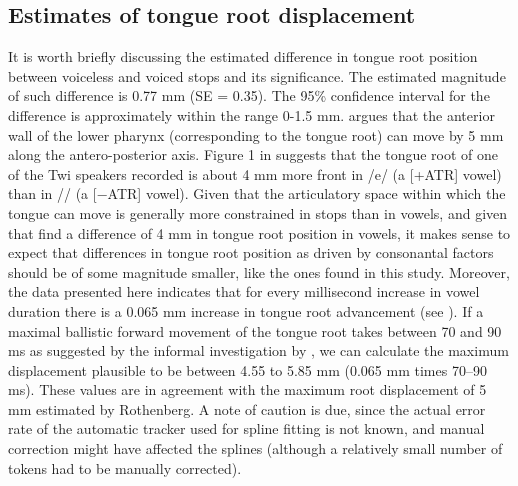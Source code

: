 \documentclass[preprint]{JASAnew}
\begin{document}
\hypertarget{estimates-of-tongue-root-displacement}{%
\subsection{Estimates of tongue root
displacement}\label{estimates-of-tongue-root-displacement}}

\label{s:estimates}

It is worth briefly discussing the estimated difference in tongue root
position between voiceless and voiced stops and its significance. The
estimated magnitude of such difference is 0.77 mm (SE = 0.35). The 95\%
confidence interval for the difference is approximately within the range
0-1.5 mm. \citet{rothenberg1967} argues that the anterior wall of the
lower pharynx (corresponding to the tongue root) can move by 5 mm along
the antero-posterior axis. Figure 1 in \citet{kirkham2017} suggests that
the tongue root of one of the Twi speakers recorded is about 4 mm more
front in /e/ (a {[}+ATR{]} vowel) than in /\textepsilon{}/ (a {[}−ATR{]}
vowel). Given that the articulatory space within which the tongue can
move is generally more constrained in stops than in vowels, and given
that \citet{kirkham2017} find a difference of 4 mm in tongue root
position in vowels, it makes sense to expect that differences in tongue
root position as driven by consonantal factors should be of some
magnitude smaller, like the ones found in this study. Moreover, the data
presented here indicates that for every millisecond increase in vowel
duration there is a 0.065 mm increase in tongue root advancement (see
). If a maximal ballistic forward movement of the
tongue root takes between 70 and 90 ms as suggested by the informal
investigation by \citet{rothenberg1967}, we can calculate the maximum
displacement plausible to be between 4.55 to 5.85 mm (0.065 mm times
70--90 ms). These values are in agreement with the maximum root
displacement of 5 mm estimated by Rothenberg. A note of caution is due,
since the actual error rate of the automatic tracker used for spline
fitting is not known, and manual correction might have affected the
splines (although a relatively small number of tokens had to be manually
corrected).
\end{document}
